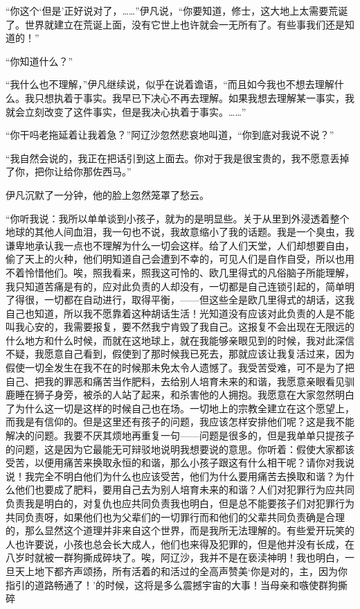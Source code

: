 \par “你这个‘但是’正好说对了，……”伊凡说，“你要知道，修士，这大地上太需要荒诞了。世界就建立在荒诞上面，没有它世上也许就会一无所有了。有些事我们还是知道的！”
\par “你知道什么？”
\par “我什么也不理解，”伊凡继续说，似乎在说着谵语，“而且如今我也不想去理解什么。我只想执着于事实。我早已下决心不再去理解。如果我想去理解某一事实，我就会立刻改变了这件事实，但是我决心执着于事实。……”
\par “你干吗老拖延着让我着急？”阿辽沙忽然悲哀地叫道，“你到底对我说不说？”
\par “我自然会说的，我正在把话引到这上面去。你对于我是很宝贵的，我不愿意丢掉了你，把你让给你那佐西马。”
\par 伊凡沉默了一分钟，他的脸上忽然笼罩了愁云。
\par “你听我说：我所以单单谈到小孩子，就为的是明显些。关于从里到外浸透着整个地球的其他人间血泪，我一句也不说，我故意缩小了我的话题。我是一个臭虫，我谦卑地承认我一点也不理解为什么一切会这样。给了人们天堂，人们却想要自由，偷了天上的火种，他们明知道自己会遭到不幸的，可见人们是自作自受，所以也用不着怜惜他们。唉，照我看来，照我这可怜的、欧几里得式的凡俗脑子所能理解，我只知道苦痛是有的，应对此负责的人却没有，一切都是自己连锁引起的，简单明了得很，一切都在自动进行，取得平衡，——但这些全是欧几里得式的胡话，这我自己也知道，所以我不愿靠着这种胡话生活！光知道没有应该对此负责的人是不能叫我心安的，我需要报复，要不然我宁肯毁了我自己。这报复不会出现在无限远的什么地方和什么时候，而就在这地球上，就在我能够亲眼见到的时候，我对此深信不疑，我愿意自己看到，假使到了那时候我已死去，那就应该让我复活过来，因为假使一切全发生在我不在的时候那未免太令人遗憾了。我受苦受难，可不是为了把自己、把我的罪恶和痛苦当作肥料，去给别人培育未来的和谐，我愿意亲眼看见驯鹿睡在狮子身旁，被杀的人站了起来，和杀害他的人拥抱。我愿意在大家忽然明白了为什么这一切是这样的时候自己也在场。一切地上的宗教全建立在这个愿望上，而我是有信仰的。但是这里还有孩子的问题，我应该怎样安排他们呢？这是我不能解决的问题。我要不厌其烦地再重复一句——问题是很多的，但是我单单只提孩子的问题，这是因为它最能无可辩驳地说明我想要说的意思。你听着：假使大家都该受苦，以便用痛苦来换取永恒的和谐，那么小孩子跟这有什么相干呢？请你对我说说！我完全不明白他们为什么也应该受苦，他们为什么要用痛苦去换取和谐？为什么他们也要成了肥料，要用自己去为别人培育未来的和谐？人们对犯罪行为应共同负责我是明白的，对复仇也应共同负责我也明白，但是总不能要孩子们对犯罪行为共同负责呀，如果他们也为父辈们的一切罪行而和他们的父辈共同负责确是合理的，那么显然这个道理并非来自这个世界，而是我所无法理解的。有些爱开玩笑的人也许要说，小孩也总会长大成人，他们也来得及犯罪的，但是他并没有长成，在八岁时就被一群狗撕成碎块了。唉，阿辽沙，我并不是在亵渎神明！我也明白，一旦天上地下都齐声颂扬，所有活着的和活过的全高声赞美‘你是对的，主，因为你指引的道路畅通了！’的时候，这将是多么震撼宇宙的大事！当母亲和嗾使群狗撕碎